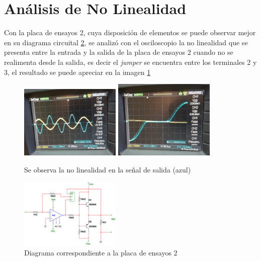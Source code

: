 \documentclass[letterpaper, 10 pt, conference]{ieeeconf}  %
\begin{document}
\section{Análisis de No Linealidad}
Con la placa de ensayos 2, cuya disposición de elementos se puede observar mejor en su diagrama circuital \ref{diagramaPlaca2}, se analizó con el osciloscopio la no linealidad que se presenta entre la entrada y la salida de la placa de ensayos 2 cuando no se realimenta desde la salida, es decir el \textit{jumper} se encuentra entre los terminales 2 y 3, el resultado se puede apreciar en la imagen \ref{imagen:nolinealidad}

\begin{figure}[H]
   \centering
   \includegraphics[width=0.43\textwidth]{./nolinealidad2.jpeg}
   \includegraphics[width=0.43\textwidth]{./nolinealidad.jpeg}
   \caption{Se observa la no linealidad en la señal de salida (azul)}
   \label{imagen:nolinealidad}
 \end{figure}

\begin{figure}[H]
   \centering
   \includegraphics[width=0.43\textwidth]{./diagramaPlaca2.png}
   \caption{Diagrama correspondiente a la placa de ensayos 2}
   \label{diagramaPlaca2}
 \end{figure}
\end{document}
